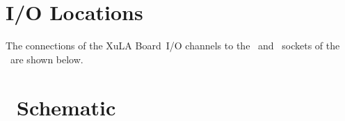 \documentclass[letterpaper,11pt,oneside]{memoir}
\newcommand{\xula}{XuLA Board}
\begin{document}
\appendix


\chapter{I/O Locations}

The connections of the \xula\ I/O channels to the \digpmod\ and \rpi\
sockets of the \product\ are shown below.




\chapter{\ Schematic}

\pagebreak
{}
\end{document}
